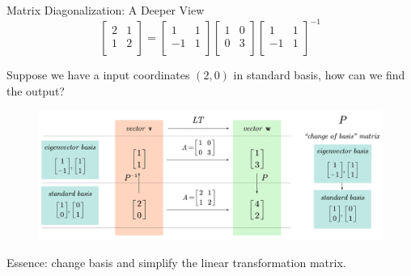 \documentclass{beamer}
\begin{document}
\begin{frame}{Matrix Diagonalization: A Deeper View}
    \begin{equation*}
        \left[ \begin{matrix}
            2&		1\\
            1&		2\\
        \end{matrix} \right] =\left[ \begin{matrix}
            1&		1\\
            -1&		1\\
        \end{matrix} \right] \left[ \begin{matrix}
            1&		0\\
            0&		3\\
        \end{matrix} \right] \left[ \begin{matrix}
            1&		1\\
            -1&		1\\
        \end{matrix} \right] ^{-1}
    \end{equation*}

Suppose we have a input coordinates $(2,0)$ in standard basis, how can we find the output?
\begin{figure}
    \centering
    \includegraphics[width=\textwidth]{PNP-1.jpg}
\end{figure}

Essence: change basis and simplify the linear transformation matrix.
\end{frame}
\end{document}
